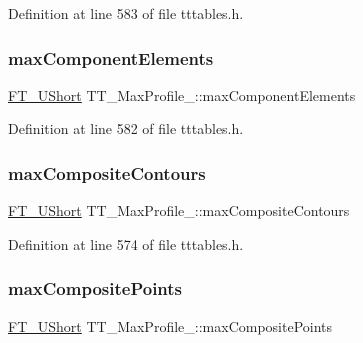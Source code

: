 Definition at line 583 of file tttables.\+h.

\mbox{\label{struct_t_t___max_profile___a110e6d735610c6d8fd89221d03440c32}} 
\subsubsection{\texorpdfstring{maxComponentElements}{maxComponentElements}}
{\footnotesize\ttfamily \mbox{\hyperlink{fttypes_8h_a937f6c17cf5ffd09086d8610c37b9f58}{F\+T\+\_\+\+U\+Short}} T\+T\+\_\+\+Max\+Profile\+\_\+\+::max\+Component\+Elements}



Definition at line 582 of file tttables.\+h.

\mbox{\label{struct_t_t___max_profile___a956e7c44e46a8aeb6d419b8550d1e556}} 
\subsubsection{\texorpdfstring{maxCompositeContours}{maxCompositeContours}}
{\footnotesize\ttfamily \mbox{\hyperlink{fttypes_8h_a937f6c17cf5ffd09086d8610c37b9f58}{F\+T\+\_\+\+U\+Short}} T\+T\+\_\+\+Max\+Profile\+\_\+\+::max\+Composite\+Contours}



Definition at line 574 of file tttables.\+h.

\mbox{\label{struct_t_t___max_profile___aafc5ef3f58254792c353a6fb3b3a044e}} 
\subsubsection{\texorpdfstring{maxCompositePoints}{maxCompositePoints}}
{\footnotesize\ttfamily \mbox{\hyperlink{fttypes_8h_a937f6c17cf5ffd09086d8610c37b9f58}{F\+T\+\_\+\+U\+Short}} T\+T\+\_\+\+Max\+Profile\+\_\+\+::max\+Composite\+Points}



